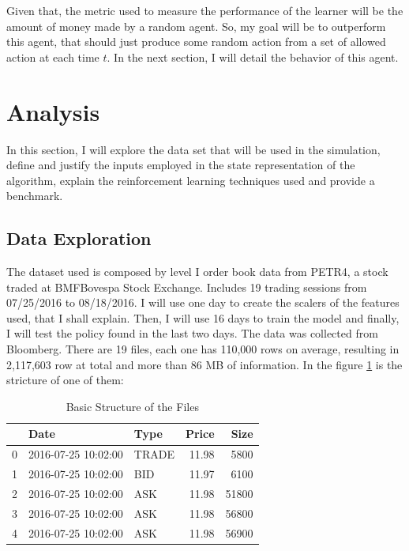 \documentclass[a4paper]{article}
\begin{document}
Given that, the metric used to measure the performance of the learner will be the amount of money made by a random agent. So, my goal will be to outperform this agent, that should just produce some random action from a set of allowed action at each time $t$. In the next section, I will detail the behavior of this agent.


\section{Analysis}
\label{sec:analysis}

In this section, I will explore the data set that will be used in the simulation, define and justify the inputs employed in the state representation of the algorithm, explain the reinforcement learning techniques used and provide a benchmark.

\subsection{Data Exploration}
The dataset used is composed by level I order book data from PETR4, a stock traded at BMFBovespa Stock Exchange. Includes 19 trading sessions from 07/25/2016 to 08/18/2016. I will use one day to create the scalers of the features used, that I shall explain. Then, I will use 16 days to train the model and finally, I will test the policy found in the last two days. The data was collected from Bloomberg. There are 19 files, each one has 110,000 rows on average, resulting in 2,117,603 row at total and more than 86 MB of information. In the figure \ref{tab:original_data} is the stricture of one of them:

\begin{table}[ht!]
\centering
\begin{tabular}{l|llrr}
{} &                Date &   Type &  Price &   Size \\
\midrule
0 & 2016-07-25 10:02:00 &  TRADE &  11.98 &   5800 \\
1 & 2016-07-25 10:02:00 &    BID &  11.97 &   6100 \\
2 & 2016-07-25 10:02:00 &    ASK &  11.98 &  51800 \\
3 & 2016-07-25 10:02:00 &    ASK &  11.98 &  56800 \\
4 & 2016-07-25 10:02:00 &    ASK &  11.98 &  56900 \\

\end{tabular}
\caption{\label{tab:original_data}Basic Structure of the Files}
\end{table}
\end{document}
